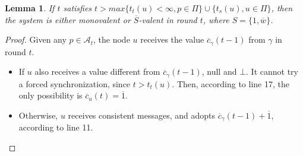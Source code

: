 \documentclass{article}
\newtheorem{lemma}{Lemma}[section]
\newcommand{\cent}{\gamma}
\newcommand{\ts}{t_{s}}
\newcommand{\try}{t_{t}}
\begin{document}
\begin{lemma}\label{lem:mono_bi}
	If $t$ satisfies $t > max \{\try(u) < \infty, p \in \Pi\} \cup \{\ts(u), u \in \Pi\}$,
	then the system is either monovalent or $\overline{S}$-valent in round $t$, where $S = \{1, \overline{w}\}$.
\end{lemma}
\begin{proof}
	Given any $p \in \mathcal{A}_t$, the node $u$ receives the value $\overline{c}_\cent(t-1)$ from $\cent$ in round $t$.
	\begin{itemize}
		\item If $u$ also receives a value different from $\overline{c}_\cent(t-1)$, null and $\bot$.
			It cannot try a forced synchronization, since $t > \try(u)$.
			Then, according to line 17, the only possibility is $\overline{c}_u(t) = \overline{1}$.
		\item Otherwise, $u$ receives consistent messages, and adopts $\overline{c}_\cent(t-1)+\overline{1}$, according to line 11.
	\end{itemize}
\end{proof}
\end{document}
